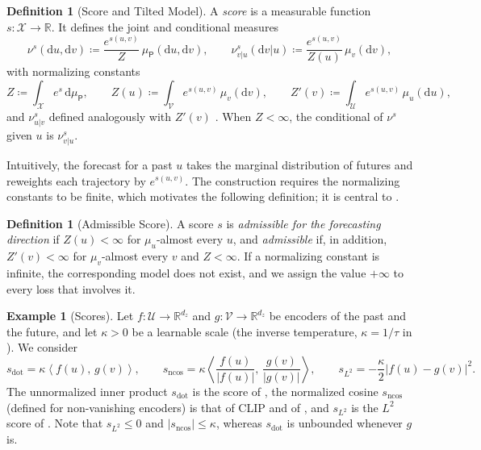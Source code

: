 \documentclass[11pt]{article}
\theoremstyle{plain}
\theoremstyle{definition}
\newtheorem{definition}[theorem]{Definition}
\newtheorem{example}[theorem]{Example}
\theoremstyle{remark}
\newcommand{\RR}{\mathbb{R}}
\newcommand{\UU}{\mathcal{U}}
\newcommand{\VV}{\mathcal{V}}
\newcommand{\XX}{\mathcal{X}}
\newcommand{\Dd}{\mathrm{d}}
\newcommand{\define}{\coloneqq}
\newcommand{\muP}{\mu_{\mathsf{P}}}
\newcommand{\IP}[2]{\left\langle #1,\, #2 \right\rangle}
\newcommand{\abs}[1]{\left\lvert #1 \right\rvert}
\newcommand{\sdot}{s_{\mathrm{dot}}}
\newcommand{\sncos}{s_{\mathrm{ncos}}}
\newcommand{\sltwo}{s_{L^2}}
\begin{document}
\begin{definition}[Score and Tilted Model]
 \label{def:model}
 A \emph{score} is a measurable function $s:\XX\to\RR$. It defines the
 joint and conditional measures
 \begin{equation}
  \nu^{s}(\Dd u,\Dd v)\define\frac{e^{s(u,v)}}{Z}\,\muP(\Dd u,\Dd v),
  \qquad
  \nu^{s}_{v\vert u}(\Dd v\vert u)\define\frac{e^{s(u,v)}}{Z(u)}\,\mu_v(\Dd v),
  \label{eq:model}
 \end{equation}
 with normalizing constants
 \begin{equation}
  Z\define\int_{\XX}e^{s}\,\Dd\muP,\qquad
  Z(u)\define\int_{\VV}e^{s(u,v)}\,\mu_v(\Dd v),\qquad
  Z'(v)\define\int_{\UU}e^{s(u,v)}\,\mu_u(\Dd u),
  \label{eq:normalizers}
 \end{equation}
 and $\nu^{s}_{u\vert v}$ defined analogously with $Z'(v)$
 \cite[Eqs.~(13)--(16)]{baptista2025mathematical}. When $Z<\infty$, the
 conditional of $\nu^{s}$ given $u$ is $\nu^{s}_{v\vert u}$.
\end{definition}

Intuitively, the forecast for a past $u$ takes the marginal distribution of
futures and reweights each trajectory by $e^{s(u,v)}$. The construction requires
the normalizing constants to be finite, which motivates the following
definition; it is central to .

\begin{definition}[Admissible Score]
 \label{def:admissible}
 A score $s$ is \emph{admissible for the forecasting direction} if
 $Z(u)<\infty$ for $\mu_u$-almost every $u$, and \emph{admissible} if, in
 addition, $Z'(v)<\infty$ for $\mu_v$-almost every $v$ and $Z<\infty$. If
 a normalizing constant is infinite, the corresponding model does not exist,
 and we assign the value $+\infty$ to every loss that involves it.
\end{definition}

\begin{example}[Scores]
 \label{ex:scores}
 Let $f:\UU\to\RR^{d_z}$ and $g:\VV\to\RR^{d_z}$ be encoders of the past and
 the future, and let $\kappa>0$ be a learnable scale (the inverse
 temperature, $\kappa=1/\tau$ in \cite{stuart2026expressivity}). We consider
 \begin{equation}
  \sdot=\kappa\IP{f(u)}{g(v)},\qquad
  \sncos=\kappa\IP{\frac{f(u)}{\abs{f(u)}}}{\frac{g(v)}{\abs{g(v)}}},\qquad
  \sltwo=-\frac{\kappa}{2}\abs{f(u)-g(v)}^{2}.
  \label{eq:scores}
 \end{equation}
 The unnormalized inner product $\sdot$ is the score of
 \cite[Thm.~4.1]{stuart2026expressivity}, the normalized cosine $\sncos$
 (defined for non-vanishing encoders) is that of CLIP \cite{radford2021clip}
 and of \cite[Thm.~4.2]{stuart2026expressivity}, and $\sltwo$ is the $L^2$
 score of \cite{baptista2025mathematical}. Note that $\sltwo\le0$ and
 $\abs{\sncos}\le\kappa$, whereas $\sdot$ is unbounded whenever $g$ is.
\end{example}
\end{document}
